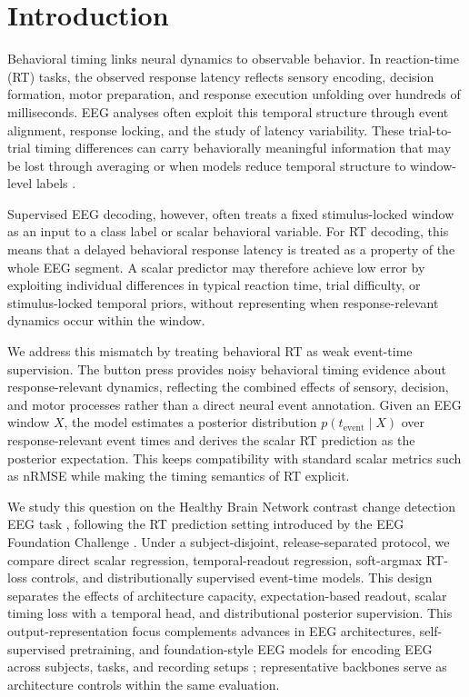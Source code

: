 \documentclass[12pt]{article}
\begin{document}
\section{Introduction}

Behavioral timing links neural dynamics to observable behavior. In reaction-time (RT) tasks, the observed response latency reflects sensory encoding, decision formation, motor preparation, and response execution unfolding over hundreds of milliseconds. EEG analyses often exploit this temporal structure through event alignment, response locking, and the study of latency variability. These trial-to-trial timing differences can carry behaviorally meaningful information that may be lost through averaging or when models reduce temporal structure to window-level labels \citep{Jung1998SingleTrialERP,Ouyang2017LatencyReview}.

Supervised EEG decoding, however, often treats a fixed stimulus-locked window as an input to a class label or scalar behavioral variable. For RT decoding, this means that a delayed behavioral response latency is treated as a property of the whole EEG segment. A scalar predictor may therefore achieve low error by exploiting individual differences in typical reaction time, trial difficulty, or stimulus-locked temporal priors, without representing when response-relevant dynamics occur within the window.

We address this mismatch by treating behavioral RT as weak event-time supervision. The button press provides noisy behavioral timing evidence about response-relevant dynamics, reflecting the combined effects of sensory, decision, and motor processes rather than a direct neural event annotation. Given an EEG window \(X\), the model estimates a posterior distribution \(p(t_{\mathrm{event}}\mid X)\) over response-relevant event times and derives the scalar RT prediction as the posterior expectation. This keeps compatibility with standard scalar metrics such as nRMSE while making the timing semantics of RT explicit.

We study this question on the Healthy Brain Network contrast change detection EEG task \citep{Shirazi2024HBNEEG}, following the RT prediction setting introduced by the EEG Foundation Challenge \citep{EEGFoundationChallengeArxiv2025,EEGChallengeWebsite2025}. Under a subject-disjoint, release-separated protocol, we compare direct scalar regression, temporal-readout regression, soft-argmax RT-loss controls, and distributionally supervised event-time models. This design separates the effects of architecture capacity, expectation-based readout, scalar timing loss with a temporal head, and distributional posterior supervision. This output-representation focus complements advances in EEG architectures, self-supervised pretraining, and foundation-style EEG models for encoding EEG across subjects, tasks, and recording setups \citep{wang2024eegpt,Jiang2024LaBraM,Chen2024EEGFormer,Wang2025EEGMamba,ElOuahidi2025REVE,Yue2024BrainGPT}; representative backbones serve as architecture controls within the same evaluation.
\end{document}

